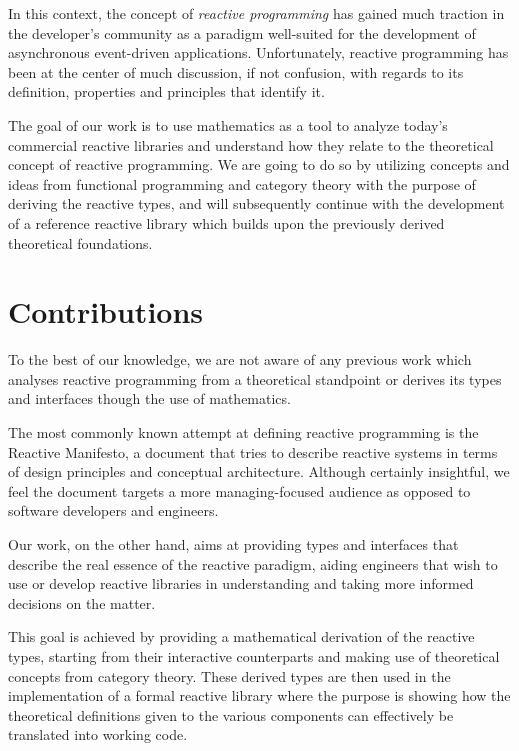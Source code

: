 In this context, the concept of \textit{reactive programming} has gained much traction in the developer's community as a paradigm well-suited for the development of asynchronous  event-driven applications\cite{bainomugisha2013survey}. Unfortunately, reactive programming has been at the center of much discussion, if not confusion, with regards to its definition, properties and principles that identify it\cite{meijer2014reactive}.

The goal of our work is to use mathematics as a tool to analyze today's commercial reactive libraries and understand how they relate to the theoretical concept of reactive programming.  We are going to do so by utilizing concepts and ideas from functional programming and category theory with the purpose of deriving the reactive types, and will subsequently continue with the development of a reference reactive library which builds upon the previously derived theoretical foundations. 

\section*{Contributions}

To the best of our knowledge, we are not aware of any previous work which analyses reactive programming from a theoretical standpoint or derives its types and interfaces though the use of mathematics.

The most commonly known attempt at defining reactive programming is the Reactive Manifesto\cite{reactive-manifesto}, a document that tries to describe reactive systems in terms of design principles and conceptual architecture. Although certainly insightful, we feel the document targets a more managing-focused audience as opposed to software developers and engineers. 

Our work, on the other hand, aims at providing types and interfaces that describe the real essence of the reactive paradigm, aiding engineers that wish to use or develop reactive libraries in understanding and taking more informed decisions on the matter.

This goal is achieved by providing a mathematical derivation of the reactive types, starting from their interactive counterparts and making use of theoretical concepts from category theory. These derived types are then used in the implementation of a formal reactive library where the purpose is showing how the theoretical definitions given to the various components can effectively be translated into working code. 


